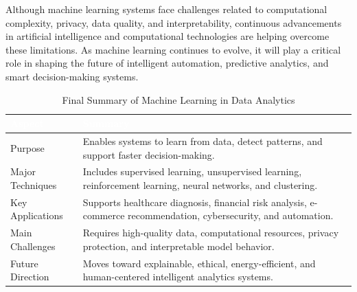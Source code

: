 \documentclass[11pt,a4paper]{article}
\begin{document}
Although machine learning systems face challenges related to computational complexity, privacy, data quality, and interpretability, continuous advancements in artificial intelligence and computational technologies are helping overcome these limitations. As machine learning continues to evolve, it will play a critical role in shaping the future of intelligent automation, predictive analytics, and smart decision-making systems.

\begin{table}[H]
\centering
\caption{Final Summary of Machine Learning in Data Analytics}
\renewcommand{\arraystretch}{1.35}
\small
\begin{tabular}{>{\raggedright\arraybackslash}p{3.6cm} >{\raggedright\arraybackslash}p{9.8cm}}
\toprule
\rowcolor{prismblue}
\textcolor{white}{\textbf{Aspect}} & \textcolor{white}{\textbf{Summary}} \\
\midrule
\rowcolor{prismlight}
Purpose & Enables systems to learn from data, detect patterns, and support faster decision-making. \\
Major Techniques & Includes supervised learning, unsupervised learning, reinforcement learning, neural networks, and clustering. \\
\rowcolor{prismlight}
Key Applications & Supports healthcare diagnosis, financial risk analysis, e-commerce recommendation, cybersecurity, and automation. \\
Main Challenges & Requires high-quality data, computational resources, privacy protection, and interpretable model behavior. \\
\rowcolor{prismlight}
Future Direction & Moves toward explainable, ethical, energy-efficient, and human-centered intelligent analytics systems. \\
\bottomrule
\end{tabular}
\end{table}


\printbibliography
\end{document}

